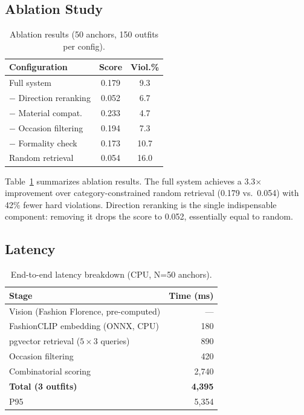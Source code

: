 \documentclass[sigconf]{acmart}
\begin{document}
\subsection{Ablation Study}

\begin{table}[t]
\centering
\small
\caption{Ablation results (50 anchors, 150 outfits per config).}
\label{tab:ablation}
\begin{tabular}{lcc}
\toprule
Configuration & Score & Viol.\% \\
\midrule
Full system & 0.179 & 9.3 \\
$-$ Direction reranking & 0.052 & 6.7 \\
$-$ Material compat. & 0.233 & 4.7 \\
$-$ Occasion filtering & 0.194 & 7.3 \\
$-$ Formality check & 0.173 & 10.7 \\
Random retrieval & 0.054 & 16.0 \\
\bottomrule
\end{tabular}
\end{table}

Table~\ref{tab:ablation} summarizes ablation results.  The full system
achieves a 3.3$\times$ improvement over category-constrained random
retrieval (0.179 vs.\ 0.054) with 42\% fewer hard violations.  Direction
reranking is the single indispensable component: removing it drops the
score to 0.052, essentially equal to random.

\subsection{Latency}

\begin{table}[t]
\centering
\small
\caption{End-to-end latency breakdown (CPU, N=50 anchors).}
\label{tab:latency}
\begin{tabular}{lr}
\toprule
Stage & Time (ms) \\
\midrule
Vision (Fashion Florence, pre-computed) & --- \\
FashionCLIP embedding (ONNX, CPU) & 180 \\
pgvector retrieval ($5 \times 3$ queries) & 890 \\
Occasion filtering & 420 \\
Combinatorial scoring & 2,740 \\
\midrule
\textbf{Total (3 outfits)} & \textbf{4,395} \\
P95 & 5,354 \\
\bottomrule
\end{tabular}
\end{table}
\end{document}
